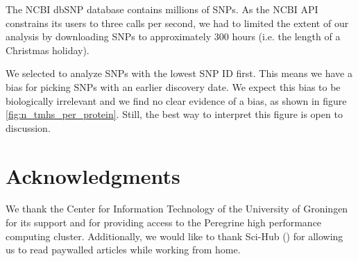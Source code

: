 The NCBI dbSNP database contains millions of SNPs.
As the NCBI API constrains its users to three calls per second,
we had to limited the extent of our analysis
by downloading SNPs to approximately 300 
hours (i.e. the length of a Christmas holiday).


We selected to analyze SNPs with the lowest SNP ID first.
This means we have a bias for picking SNPs with
an earlier discovery date.
We expect this bias to be biologically irrelevant
and we find no clear evidence of a bias, as
shown in figure \ref{fig:n_tmhs_per_protein}.
Still, the best way to interpret this figure
is open to discussion.

% 
% 

\section{Acknowledgments}

We thank the Center for Information Technology of the University 
of Groningen for its support and for providing access to the Peregrine 
high performance computing cluster. 
Additionally, we would like to thank Sci-Hub (\cite{himmelstein2018sci})
for allowing us to read paywalled articles while working from home.

